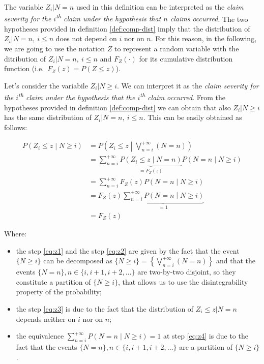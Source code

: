 \documentclass[a4paper, twoside, openright, 12pt]{report}
\providecommand{\tightlist}{%
  \setlength{\itemsep}{0pt}\setlength{\parskip}{0pt}}
\theoremstyle{definition}
\theoremstyle{definition}
\theoremstyle{definition}
\theoremstyle{remark}
\begin{document}
The variable \(Z_i|N=n\) used in this definition can be interpreted as the \emph{claim severity for the \(i\)\textsuperscript{th} claim under the hypothesis that \(n\) claims occurred}. The two hypotheses provided in definition \ref{def:comp-dist} imply that the distribution of \(Z_i|N=n, \ i\le n\) does not depend on \(i\) nor on \(n\). For this reason, in the following, we are going to use the notation \(Z\) to represent a random variable with the ditribution of \(Z_i|N=n, \ i\le n\) and \(F_Z(\cdot)\) for its cumulative distribution function (i.e.~\(F_Z(z) = P(Z\le z)\)).

Let's consider the variabile \(Z_i|N\ge i\). We can interpret it as the \emph{claim severity for the \(i\)\textsuperscript{th} claim under the hypothesis that the \(i\)\textsuperscript{th} claim occurred}. From the hypotheses provided in definition \ref{def:comp-dist} we can obtain that also \(Z_i|N\ge i\) has the same distribution of \(Z_i|N=n, \ i\le n\). This can be easily obtained as follows:

\begin{align}
\label{eq:z1}
P\left(Z_i \le z \middle| N\ge i \right) & = P\left(Z_i \le z \middle| \bigvee_{n = i}^{+\infty}{(N=n)}\right)
\\ \label{eq:z2} & =
\sum_{n=i}^{+\infty}{ \underbrace{P\left(Z_i\le z \middle| N=n\right)}_{=F_Z(z)} P\left( N = n \middle| N\ge i \right)}
\\ \label{eq:z3} & =
\sum_{n=i}^{+\infty}{ F_Z(z) P\left( N = n \middle| N\ge i \right)}
\\ \label{eq:z4} & =
F_Z(z) \underbrace{\sum_{n=i}^{+\infty}{P\left( N = n \middle| N\ge i \right)}}_{=1}
\\ \nonumber & =
F_Z(z)
\end{align}

Where:

\begin{itemize}
\tightlist
\item
  the step \eqref{eq:z1} and the step \eqref{eq:z2} are given by the fact that the event \(\{N\ge i\}\) can be decomposed as \(\{N\ge i\} = \left\{ \bigvee_{n = i}^{+\infty}{(N=n)} \right\}\) and that the events \(\{N=n\}, n\in\{i, i+1, i+2, \dots\}\) are two-by-two disjoint, so they constitute a partition of \(\{N\ge i\}\), that allows us to use the disintegrability property of the probability;
\item
  the step \eqref{eq:z3} is due to the fact that the distribution of \(Z_i\le z | N=n\) depends neither on \(i\) nor on \(n\);
\item
  the equivalence \(\sum_{n=i}^{+\infty}{P\left( N = n \middle| N\ge i \right)} = 1\) at step \eqref{eq:z4} is due to the fact that the events \(\{N=n\}, n\in\{i, i+1, i+2, \dots\}\) are a partition of \(\{N\ge i\}\).
\end{itemize}
\end{document}
